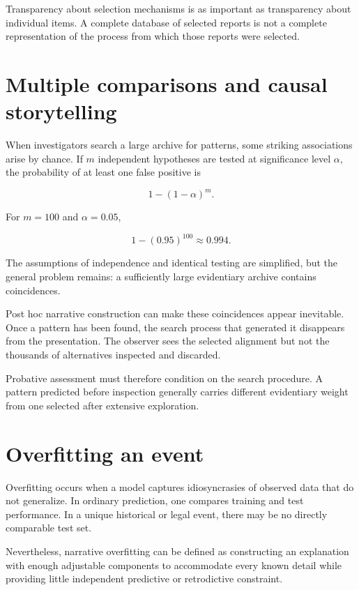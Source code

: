 Transparency about selection mechanisms is as important as transparency about individual items. A complete database of selected reports is not a complete representation of the process from which those reports were selected.

\section{Multiple comparisons and causal storytelling}
\label{sec:a43}

When investigators search a large archive for patterns, some striking associations arise by chance. If \(m\) independent hypotheses are tested at significance level \(\alpha\), the probability of at least one false positive is

\[
1-(1-\alpha)^m.
\]

For \(m=100\) and \(\alpha=0.05\),

\[
1-(0.95)^{100}\approx0.994.
\]

The assumptions of independence and identical testing are simplified, but the general problem remains: a sufficiently large evidentiary archive contains coincidences.

Post hoc narrative construction can make these coincidences appear inevitable. Once a pattern has been found, the search process that generated it disappears from the presentation. The observer sees the selected alignment but not the thousands of alternatives inspected and discarded.

Probative assessment must therefore condition on the search procedure. A pattern predicted before inspection generally carries different evidentiary weight from one selected after extensive exploration.

\section{Overfitting an event}
\label{sec:a44}

Overfitting occurs when a model captures idiosyncrasies of observed data that do not generalize. In ordinary prediction, one compares training and test performance. In a unique historical or legal event, there may be no directly comparable test set.

Nevertheless, narrative overfitting can be defined as constructing an explanation with enough adjustable components to accommodate every known detail while providing little independent predictive or retrodictive constraint.


